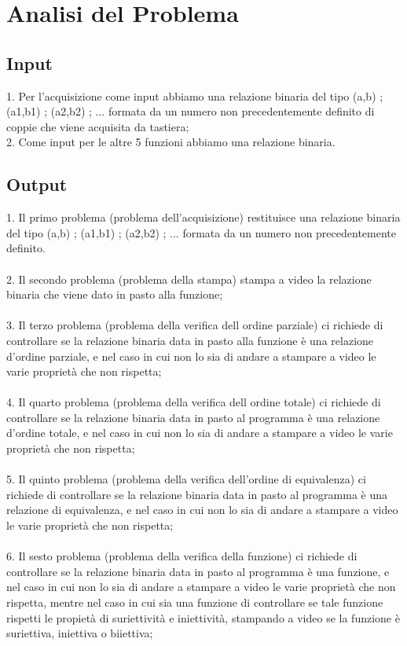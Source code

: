 \documentclass[11pt, a4paper, titlepage, block]{article}
\begin{document}
	\section{Analisi del Problema}
	\subsection{Input}
	
	
	1. Per l'acquisizione come input abbiamo una relazione binaria del tipo { (a,b)  ;  (a1,b1)  ;  (a2,b2) ; ...} formata da un numero non precedentemente definito di coppie che viene acquisita da tastiera;\\
	2. Come input per le altre 5 funzioni abbiamo una relazione binaria.\\
	\subsection{Output}
	
	
	1. Il primo problema (problema dell'acquisizione)  restituisce una relazione binaria del tipo { (a,b)  ;  (a1,b1)  ;  (a2,b2) ; ...} formata da un numero non precedentemente definito.\\
	\\
	2. Il secondo problema  (problema della stampa)  stampa a video la relazione binaria che viene dato in pasto alla funzione;\\
	\\
	3. Il terzo problema  (problema della verifica dell ordine parziale)  ci richiede di controllare se la relazione binaria data in pasto alla funzione \`e una relazione d'ordine parziale, e nel caso in cui non lo sia di andare a stampare a video le varie propriet\`a che non rispetta;\\
	\\
	4. Il quarto problema  (problema della verifica dell ordine totale)  ci richiede di controllare se la relazione binaria data in pasto al programma \`e una relazione d'ordine totale, e nel caso in cui non lo sia di andare a stampare a video le varie propriet\`a che non rispetta;\\
	\\
	5. Il quinto problema  (problema della verifica dell'ordine di equivalenza)  ci richiede di controllare se la relazione binaria data in pasto al programma \`e una relazione di equivalenza, e nel caso in cui non lo sia di andare a stampare a video le varie propriet\`a che non rispetta;\\
	\\
	6. Il sesto problema  (problema della verifica della funzione)  ci richiede di controllare se la relazione binaria data in pasto al programma \`e una funzione, e nel caso in cui non lo sia di andare a stampare a video le varie propriet\`a che non rispetta, mentre nel caso in cui sia una funzione di controllare se tale funzione rispetti le propiet\`a di suriettivit\`a e iniettivit\`a, stampando a video se la funzione \`e suriettiva, iniettiva o biiettiva;\\
	
\end{document}
